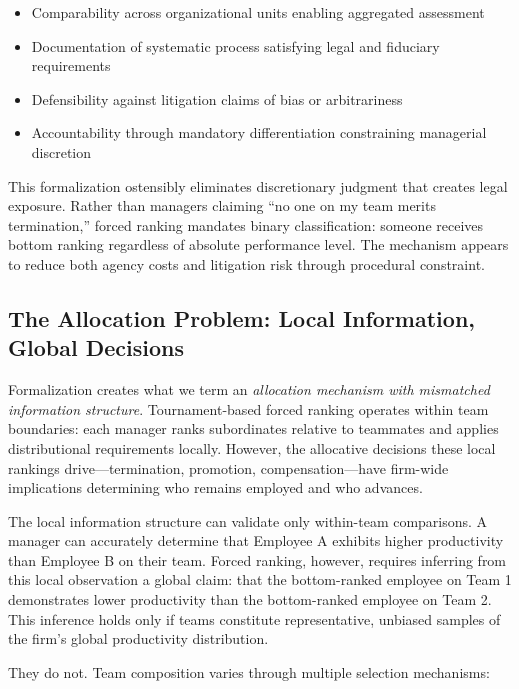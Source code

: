 \documentclass[12pt]{article}
\begin{document}
\begin{itemize}
\item Comparability across organizational units enabling aggregated assessment
\item Documentation of systematic process satisfying legal and fiduciary requirements
\item Defensibility against litigation claims of bias or arbitrariness
\item Accountability through mandatory differentiation constraining managerial discretion
\end{itemize}

This formalization ostensibly eliminates discretionary judgment that creates legal exposure. Rather than managers claiming ``no one on my team merits termination,'' forced ranking mandates binary classification: someone receives bottom ranking regardless of absolute performance level. The mechanism appears to reduce both agency costs and litigation risk through procedural constraint.

\subsection{The Allocation Problem: Local Information, Global Decisions}

Formalization creates what we term an \emph{allocation mechanism with mismatched information structure}. Tournament-based forced ranking operates within team boundaries: each manager ranks subordinates relative to teammates and applies distributional requirements locally. However, the allocative decisions these local rankings drive---termination, promotion, compensation---have firm-wide implications determining who remains employed and who advances.

The local information structure can validate only within-team comparisons. A manager can accurately determine that Employee A exhibits higher productivity than Employee B on their team. Forced ranking, however, requires inferring from this local observation a global claim: that the bottom-ranked employee on Team 1 demonstrates lower productivity than the bottom-ranked employee on Team 2. This inference holds only if teams constitute representative, unbiased samples of the firm's global productivity distribution.

They do not. Team composition varies through multiple selection mechanisms:
\end{document}
